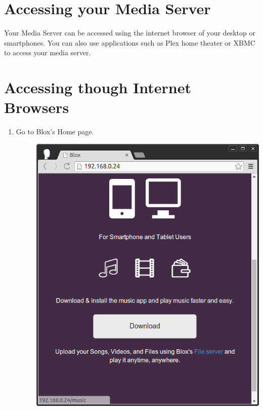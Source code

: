 \documentclass[letterpaper,10pt,english]{sphinxmanual}
\begin{document}
\section{Accessing your Media Server}
\label{video_and_pictures:accessing-your-media-server}\label{video_and_pictures:id2}
Your Media Server can be accessed using the internet browser of your desktop or smartphones. You can also use applications such as Plex home theater or XBMC to access your media server.


\section{Accessing though Internet Browsers}
\label{video_and_pictures:accessing-through-browsers}\label{video_and_pictures:accessing-though-internet-browsers}\begin{enumerate}
\item {} \begin{description}
\item[{Go to Blox's Home page.}] \leavevmode
\includegraphics{mainpage.png}

\end{description}


\end{enumerate}
\end{document}

